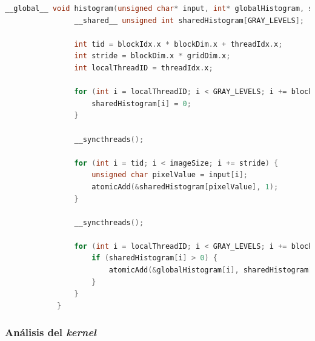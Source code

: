         \begin{lstlisting}[language=C, caption={\textit{Kernel} usando memoria compartida.}, gobble=12]
            __global__ void histogram(unsigned char* input, int* globalHistogram, size_t imageSize) {
                __shared__ unsigned int sharedHistogram[GRAY_LEVELS];
            
                int tid = blockIdx.x * blockDim.x + threadIdx.x;
                int stride = blockDim.x * gridDim.x;
                int localThreadID = threadIdx.x;
            
                for (int i = localThreadID; i < GRAY_LEVELS; i += blockDim.x) {
                    sharedHistogram[i] = 0;
                }
            
                __syncthreads();
            
                for (int i = tid; i < imageSize; i += stride) {
                    unsigned char pixelValue = input[i];
                    atomicAdd(&sharedHistogram[pixelValue], 1);
                }
            
                __syncthreads();
            
                for (int i = localThreadID; i < GRAY_LEVELS; i += blockDim.x) {
                    if (sharedHistogram[i] > 0) {
                        atomicAdd(&globalHistogram[i], sharedHistogram[i]);
                    }
                }
            }
        \end{lstlisting}
        
        \subsubsection{Análisis del \textit{kernel}}
                        
